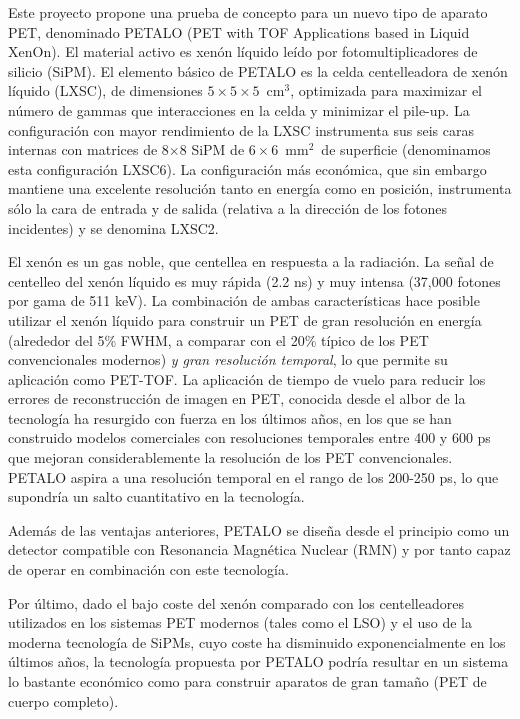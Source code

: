 Este proyecto propone una prueba de concepto para un nuevo tipo de aparato PET, denominado PETALO (PET with TOF Applications based in Liquid XenOn). El material activo es xenón líquido leído por fotomultiplicadores de silicio (SiPM). El elemento básico de PETALO es la celda centelleadora de xenón líquido (LXSC), de dimensiones $5\times 5 \times 5$~cm$^3$, optimizada para maximizar el número de gammas que interacciones en la celda y minimizar el pile-up. La configuración con mayor rendimiento de la LXSC instrumenta sus seis caras internas con matrices de 8$\times$8 SiPM de $6 \times 6$~mm$^2$~de superficie (denominamos esta configuración LXSC6). La configuración más económica, que sin embargo mantiene una excelente resolución tanto en energía como en posición, instrumenta sólo la cara de entrada y de salida (relativa a la dirección de los fotones incidentes) y se denomina LXSC2.

El xenón es un gas noble, que centellea en respuesta a la radiación. La señal de centelleo del xenón líquido es muy rápida (2.2 ns) y muy intensa (37,000 fotones por gama de 511 keV). La combinación de ambas características hace posible utilizar el xenón líquido para construir un PET de gran resolución en energía (alrededor del 5\% FWHM, a comparar con el 20\% típico de los PET convencionales modernos) {\em y gran resolución temporal}, lo que permite su aplicación como PET-TOF. La aplicación de tiempo de vuelo para reducir los errores de reconstrucción de imagen en PET, conocida desde el albor de la tecnología ha resurgido con fuerza en los últimos años, en los que se han construido modelos comerciales con resoluciones temporales entre 400 y 600 ps que mejoran considerablemente la resolución de los PET convencionales. PETALO aspira a una resolución temporal en el rango de los 200-250 ps, lo que supondría un salto cuantitativo en la tecnología.

Además de las ventajas anteriores, PETALO se diseña desde el principio como un detector compatible con Resonancia Magnética Nuclear (RMN) y por tanto capaz de operar en combinación con este tecnología.

Por último, dado el bajo coste del xenón comparado con los centelleadores utilizados en los sistemas PET modernos (tales como el LSO) y el uso de la moderna tecnología de SiPMs, cuyo coste ha disminuido exponencialmente en los últimos años, la tecnología propuesta por PETALO podría resultar en un sistema lo bastante económico como para construir aparatos de gran tamaño (PET de cuerpo completo). 

